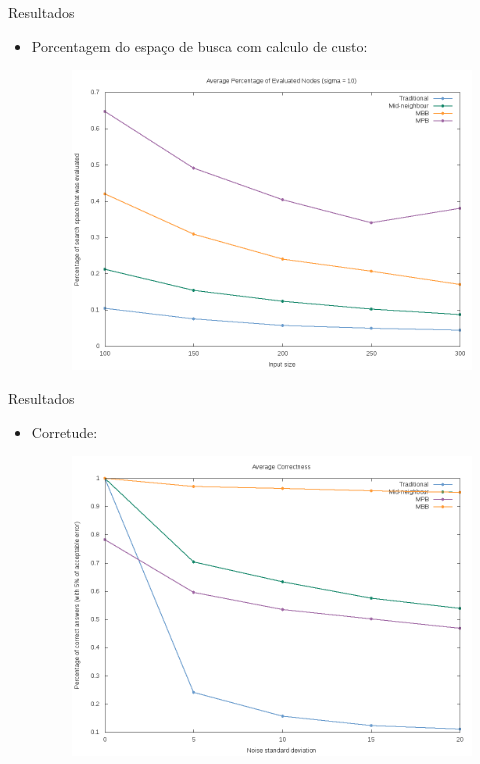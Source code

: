 \documentclass{beamer}
\begin{document}
\begin{frame}{Resultados}
    \begin{itemize}
        \item{Porcentagem do espaço de busca com calculo de custo:}
            \begin{figure}[h]
            \includegraphics[scale=.3]{evaluations_result}
        \end{figure}
    \end{itemize}
\end{frame}
\begin{frame}{Resultados}
    \begin{itemize}
        \item{Corretude:}
            \begin{figure}[h]
            \includegraphics[scale=.3]{correctness_result}
        \end{figure}
    \end{itemize}
\end{frame}
\end{document}
